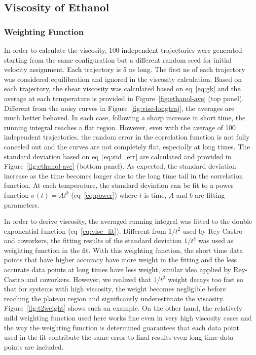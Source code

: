\documentclass[12pt]{article}
\begin{document}
\subsection{Viscosity of Ethanol}

\subsubsection{Weighting Function}

In order to calculate the viscosity,
100 independent trajectories were generated starting from the same configuration but a different random seed for initial velocity assignment.
Each trajectory is 5 ns long.
The first ns of each trajectory was considered equilibration and ignored in the viscosity calculation.
Based on each trajectory, 
the shear viscosity was calculated based on eq~\ref{eq:gk} 
and the average at each temperature is provided in Figure~\ref{fig:ethanol-ave} (top panel).
Different from the noisy curves in Figure~\ref{fig:visc-longtraj},
the averages are much better behaved.
In each case, following a sharp increase in short time,
the running integral reaches a flat region.
However, even with the average of 100 independent trajectories,
the random error in the correlation function is not fully canceled out and the curves are not completely flat,
especially at long times.
The standard deviation based on eq~\ref{eq:std_err} are calculated and provided in Figure~\ref{fig:ethanol-ave} (bottom panel).
As expected, the standard deviation increase as the time becomes longer due to the long time tail in the correlation function.
\cite{Verlet.PRA.7.1690.1973}
At each temperature,
the standard deviation can be fit to a power function $\sigma(t) = At^{b}$ (eq~\ref{eq:power}) 
where $t$ is time, $A$ and $b$ are fitting parameters.

In order to derive viscosity,
the averaged running integral was fitted to the double exponential function (eq~\ref{eq:visc_fit}).
\cite{Rey-Castro.JPC.B.110.14426.2006}
Different from $1/t^2$ used by Rey-Castro and coworkers,
\cite{Rey-Castro.JPC.B.110.14426.2006}
the fitting results of the standard deviation $1/t^b$ was used as weighting function in the fit.
With this weighting function,
the short time data points that have higher accuracy have more weight in the fitting
and the less accurate data points at long times have less weight, 
similar idea applied by Rey-Castro and coworkers.
\cite{Rey-Castro.JPC.B.110.14426.2006}
However, we realized that $1/t^2$ weight decays too fast 
so that for systems with high viscosity, 
the weight becomes negligible before reaching the plateau region
and significantly underestimate the viscosity.
Figure~\ref{fig:t2weight} shows such an example.
On the other hand, the relatively mild weighting function used here works fine even in very high viscosity cases
and the way the weighting function is determined guarantees 
that each data point used in the fit contribute the same error to final results
even long time data points are included.
\end{document}
